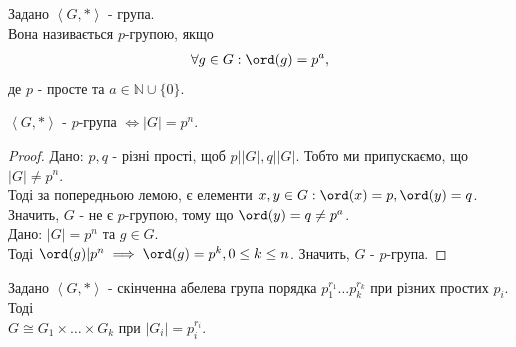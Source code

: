 \documentclass{math_library}
\begin{document}
\begin{definition}
Задано $\left<G,* \right>$ - група.\\
Вона називається $p$-групою, якщо
\begin{align*}
\forall g \in G: \ord(g) = p^a,
\end{align*}
де $p$ - просте та $a \in \mathbb{N} \cup \{0\}$.
\end{definition}

\begin{lemma}
$\left< G, *\right>$ - $p$-група $\iff |G| = p^n$.
\end{lemma}

\begin{proof}
\rightproof Дано: $p,q$ - різні прості, щоб $p | |G|, q | |G|$. Тобто ми припускаємо, що $|G| \neq p^n$.\\
Тоді за попередньою лемою, є елементи $x,y \in G: \ord(x) = p, \ord(y) = q$.\\
Значить, $G$ - не є $p$-групою, тому що $\ord(y) = q \neq p^a$.
\bigskip \\
\leftproof Дано: $|G| = p^n$ та $g \in G$.\\
Тоді $\ord(g) | p^n \implies \ord(g) = p^k, 0 \leq k \leq n$. Значить, $G$ - $p$-група.
\end{proof}

\begin{lemma}
Задано $\left< G,* \right>$ - скінченна абелева група порядка $p_1^{r_1} \dots p_k^{r_k}$ при різних простих $p_i$. Тоді\\
$G \cong G_1 \times \dots \times G_k$ при $|G_i| = p_i^{r_i}$.
\end{lemma}
\end{document}
